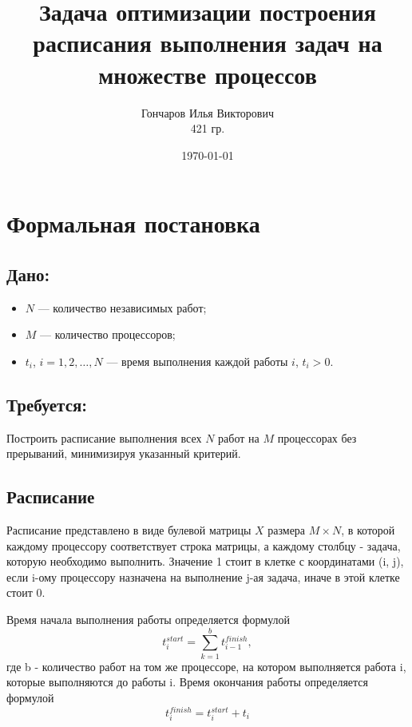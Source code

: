 \documentclass[openany, twoside, a4paper, 12pt]{extbook}
\author{Гончаров Илья Викторович \\ 421 гр.}
\title{Задача оптимизации построения расписания выполнения задач на множестве процессов}
\date{\today}
\begin{document}
    \maketitle
	\section*{Формальная постановка}
	\subsection*{Дано:}
	
	\begin{itemize}
	    \item \( N \) — количество независимых работ;
	    \item \( M \) — количество процессоров;
	    \item \( t_i \), \( i = 1, 2, \dots, N \) — время выполнения каждой работы \( i \), \( t_i > 0 \).
	\end{itemize}
	
	\subsection*{Требуется:}
	
	Построить расписание выполнения всех
	\( N \) работ на \( M \) процессорах без прерываний, минимизируя указанный критерий.

	\subsection*{Расписание}

	Расписание представлено в виде булевой матрицы $X$ размера $ M \times N $, в которой каждому процессору соответствует строка матрицы, а каждому столбцу - задача, которую необходимо выполнить. Значение 1 стоит в клетке с координатами (i, j), если i-ому процессору назначена на выполнение j-ая задача, иначе в этой клетке стоит 0.

   Время начала выполнения работы определяется формулой $$t^{start}_i = \sum^{b}_{k=1}t^{finish}_{i-1},$$ где b - количество работ на том же процессоре, на котором выполняется работа i, которые выполняются до работы i. Время окончания работы определяется формулой $$t_i^{finish} = t^{start}_i + t_i$$ 
\end{document}
